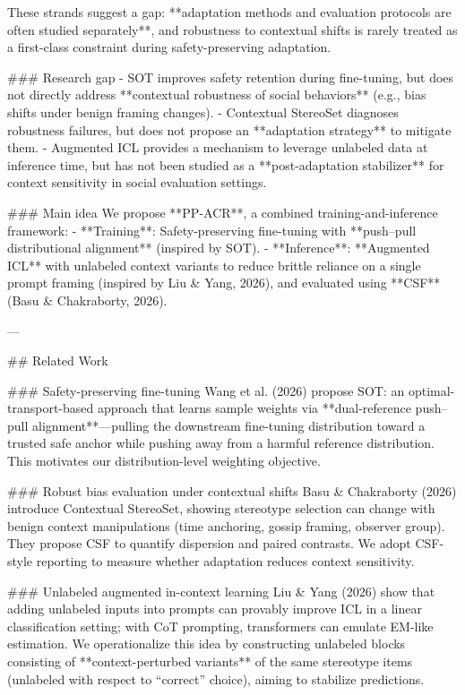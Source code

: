 These strands suggest a gap: **adaptation methods and evaluation protocols are often studied separately**, and robustness to contextual shifts is rarely treated as a first-class constraint during safety-preserving adaptation.

### Research gap  
- SOT improves safety retention during fine-tuning, but does not directly address **contextual robustness of social behaviors** (e.g., bias shifts under benign framing changes).  
- Contextual StereoSet diagnoses robustness failures, but does not propose an **adaptation strategy** to mitigate them.  
- Augmented ICL provides a mechanism to leverage unlabeled data at inference time, but has not been studied as a **post-adaptation stabilizer** for context sensitivity in social evaluation settings.

### Main idea  
We propose **PP-ACR**, a combined training-and-inference framework:  
- **Training**: Safety-preserving fine-tuning with **push–pull distributional alignment** (inspired by SOT).  
- **Inference**: **Augmented ICL** with unlabeled context variants to reduce brittle reliance on a single prompt framing (inspired by Liu & Yang, 2026), and evaluated using **CSF** (Basu & Chakraborty, 2026).

---

## Related Work  

### Safety-preserving fine-tuning  
Wang et al. (2026) propose SOT: an optimal-transport-based approach that learns sample weights via **dual-reference push–pull alignment**—pulling the downstream fine-tuning distribution toward a trusted safe anchor while pushing away from a harmful reference distribution. This motivates our distribution-level weighting objective.

### Robust bias evaluation under contextual shifts  
Basu & Chakraborty (2026) introduce Contextual StereoSet, showing stereotype selection can change with benign context manipulations (time anchoring, gossip framing, observer group). They propose CSF to quantify dispersion and paired contrasts. We adopt CSF-style reporting to measure whether adaptation reduces context sensitivity.

### Unlabeled augmented in-context learning  
Liu & Yang (2026) show that adding unlabeled inputs into prompts can provably improve ICL in a linear classification setting; with CoT prompting, transformers can emulate EM-like estimation. We operationalize this idea by constructing unlabeled blocks consisting of **context-perturbed variants** of the same stereotype items (unlabeled with respect to “correct” choice), aiming to stabilize predictions.

